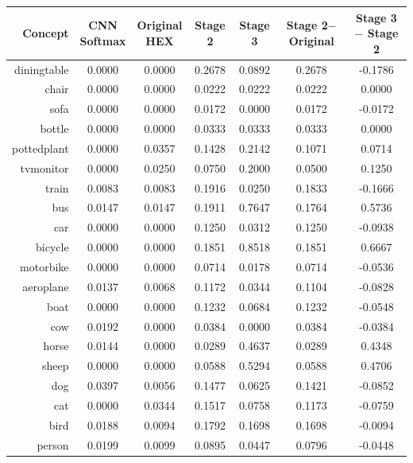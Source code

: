 \documentclass[11pt,a4paper]{article}
\begin{document}
\begin{table}[htbp]
\centering
\begin{tabular}{r|c|c|c|c|c|c}
Concept & \makecell{CNN\\Softmax} & \makecell{Original\\HEX} & Stage 2 & Stage 3 & \makecell{Stage 2$-$\\Original} & \makecell{Stage 3$-$\\Stage 2}\\\hline
diningtable   & 0.0000 & 0.0000 & 0.2678 & 0.0892 & 0.2678 & -0.1786\\
chair         & 0.0000 & 0.0000 & 0.0222 & 0.0222 & 0.0222 & 0.0000\\
sofa          & 0.0000 & 0.0000 & 0.0172 & 0.0000 & 0.0172 & -0.0172\\
bottle        & 0.0000 & 0.0000 & 0.0333 & 0.0333 & 0.0333 & 0.0000\\
pottedplant   & 0.0000 & 0.0357 & 0.1428 & 0.2142 & 0.1071 & 0.0714\\
tvmonitor     & 0.0000 & 0.0250 & 0.0750 & 0.2000 & 0.0500 & 0.1250\\
train         & 0.0083 & 0.0083 & 0.1916 & 0.0250 & 0.1833 & -0.1666\\
bus           & 0.0147 & 0.0147 & 0.1911 & 0.7647 & 0.1764 & 0.5736\\
car           & 0.0000 & 0.0000 & 0.1250 & 0.0312 & 0.1250 & -0.0938\\
bicycle       & 0.0000 & 0.0000 & 0.1851 & 0.8518 & 0.1851 & 0.6667\\
motorbike     & 0.0000 & 0.0000 & 0.0714 & 0.0178 & 0.0714 & -0.0536\\
aeroplane     & 0.0137 & 0.0068 & 0.1172 & 0.0344 & 0.1104 & -0.0828\\
boat          & 0.0000 & 0.0000 & 0.1232 & 0.0684 & 0.1232 & -0.0548\\
cow           & 0.0192 & 0.0000 & 0.0384 & 0.0000 & 0.0384 & -0.0384\\
horse         & 0.0144 & 0.0000 & 0.0289 & 0.4637 & 0.0289 & 0.4348\\
sheep         & 0.0000 & 0.0000 & 0.0588 & 0.5294 & 0.0588 & 0.4706\\
dog           & 0.0397 & 0.0056 & 0.1477 & 0.0625 & 0.1421 & -0.0852\\
cat           & 0.0000 & 0.0344 & 0.1517 & 0.0758 & 0.1173 & -0.0759\\
bird          & 0.0188 & 0.0094 & 0.1792 & 0.1698 & 0.1698 & -0.0094\\
person        & 0.0199 & 0.0099 & 0.0895 & 0.0447 & 0.0796 & -0.0448\\\hline

\end{tabular}
\end{table}
\end{document}
